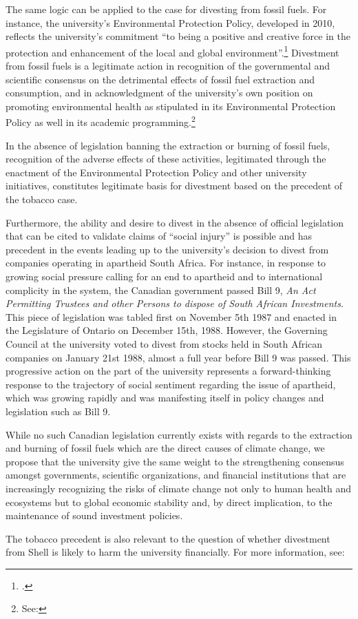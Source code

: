 The same logic can be applied to the case for divesting from fossil fuels. 
For instance, the university's Environmental Protection Policy, developed in 2010, reflects the university's commitment ``to being a positive and creative force in the protection and enhancement of the local and global environment''.\footcite[][]{UTEnvProtectionPolicy}
Divestment from fossil fuels is a legitimate action in recognition of the governmental and scientific consensus on the detrimental effects of fossil fuel extraction and consumption, and in acknowledgment of the university's own position on promoting environmental health as stipulated in its Environmental Protection Policy as well in its academic programming.\footnote{See: }



In the absence of legislation banning the extraction or burning of fossil fuels, recognition of the adverse effects of these activities, legitimated through the enactment of the Environmental Protection Policy and other university initiatives, constitutes legitimate basis for divestment based on the precedent of the tobacco case.  



Furthermore, the ability and desire to divest in the absence of official legislation that can be cited to validate claims of ``social injury'' is possible and has precedent in the events leading up to the university's decision to divest from companies operating in apartheid South Africa. 
For instance, in response to growing social pressure calling for an end to apartheid and to international complicity in the system, the Canadian government passed Bill 9, \emph{An Act Permitting Trustees and other Persons to dispose of South African Investments}.
This piece of legislation was tabled first on November 5th 1987 and enacted in the Legislature of Ontario on December 15th, 1988. 
However, the Governing Council at the university voted to divest from stocks held in South African companies on January 21st 1988, almost a full year before Bill 9 was passed. 
This progressive action on the part of the university represents a forward-thinking response to the trajectory of social sentiment regarding the issue of apartheid, which was growing rapidly and was manifesting itself in policy changes and legislation such as Bill 9. 



While no such Canadian legislation currently exists with regards to the extraction and burning of fossil fuels which are the direct causes of climate change, we propose that the university give the same weight to the strengthening consensus amongst governments, scientific organizations, and financial institutions that are increasingly recognizing the risks of climate change not only to human health and ecosystems but to global economic stability and, by direct implication, to the maintenance of sound investment policies.



The tobacco precedent is also relevant to the question of whether divestment from Shell is likely to harm the university financially. For more information, see: 



